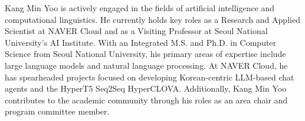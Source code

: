 Kang Min Yoo is actively engaged in the fields of artificial intelligence and computational linguistics. He currently holds key roles as a Research and Applied Scientist at NAVER Cloud and as a Visiting Professor at Seoul National University's AI Institute. With an Integrated M.S. and Ph.D. in Computer Science from Seoul National University, his primary areas of expertise include large language models and natural language processing. At NAVER Cloud, he has spearheaded projects focused on developing Korean-centric LLM-based chat agents and the HyperT5 Seq2Seq HyperCLOVA. Additionally, Kang Min Yoo contributes to the academic community through his roles as an area chair and program committee member.